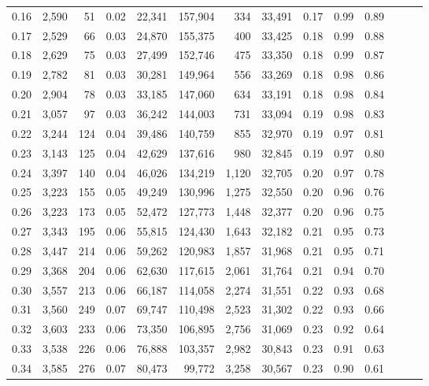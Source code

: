 \begin{tabular}{rrrrrrrrrrrrrr}
0.16 &  2,590 &   51 &  0.02 &   22,341 &  157,904 &     334 &  33,491 &  0.17 &  0.99 &      0.89 \\
0.17 &  2,529 &   66 &  0.03 &   24,870 &  155,375 &     400 &  33,425 &  0.18 &  0.99 &      0.88 \\
0.18 &  2,629 &   75 &  0.03 &   27,499 &  152,746 &     475 &  33,350 &  0.18 &  0.99 &      0.87 \\
0.19 &  2,782 &   81 &  0.03 &   30,281 &  149,964 &     556 &  33,269 &  0.18 &  0.98 &      0.86 \\
0.20 &  2,904 &   78 &  0.03 &   33,185 &  147,060 &     634 &  33,191 &  0.18 &  0.98 &      0.84 \\
0.21 &  3,057 &   97 &  0.03 &   36,242 &  144,003 &     731 &  33,094 &  0.19 &  0.98 &      0.83 \\
0.22 &  3,244 &  124 &  0.04 &   39,486 &  140,759 &     855 &  32,970 &  0.19 &  0.97 &      0.81 \\
0.23 &  3,143 &  125 &  0.04 &   42,629 &  137,616 &     980 &  32,845 &  0.19 &  0.97 &      0.80 \\
0.24 &  3,397 &  140 &  0.04 &   46,026 &  134,219 &   1,120 &  32,705 &  0.20 &  0.97 &      0.78 \\
0.25 &  3,223 &  155 &  0.05 &   49,249 &  130,996 &   1,275 &  32,550 &  0.20 &  0.96 &      0.76 \\
0.26 &  3,223 &  173 &  0.05 &   52,472 &  127,773 &   1,448 &  32,377 &  0.20 &  0.96 &      0.75 \\
0.27 &  3,343 &  195 &  0.06 &   55,815 &  124,430 &   1,643 &  32,182 &  0.21 &  0.95 &      0.73 \\
0.28 &  3,447 &  214 &  0.06 &   59,262 &  120,983 &   1,857 &  31,968 &  0.21 &  0.95 &      0.71 \\
0.29 &  3,368 &  204 &  0.06 &   62,630 &  117,615 &   2,061 &  31,764 &  0.21 &  0.94 &      0.70 \\
0.30 &  3,557 &  213 &  0.06 &   66,187 &  114,058 &   2,274 &  31,551 &  0.22 &  0.93 &      0.68 \\
0.31 &  3,560 &  249 &  0.07 &   69,747 &  110,498 &   2,523 &  31,302 &  0.22 &  0.93 &      0.66 \\
0.32 &  3,603 &  233 &  0.06 &   73,350 &  106,895 &   2,756 &  31,069 &  0.23 &  0.92 &      0.64 \\
0.33 &  3,538 &  226 &  0.06 &   76,888 &  103,357 &   2,982 &  30,843 &  0.23 &  0.91 &      0.63 \\
0.34 &  3,585 &  276 &  0.07 &   80,473 &   99,772 &   3,258 &  30,567 &  0.23 &  0.90 &      0.61 \\

\end{tabular}
